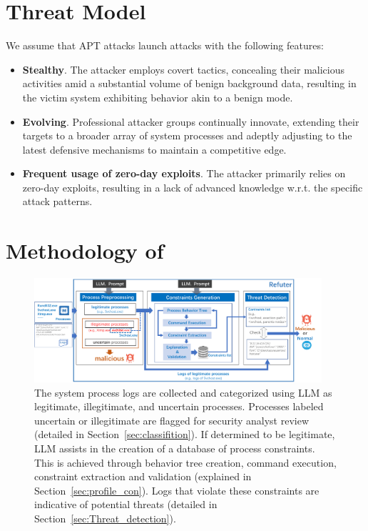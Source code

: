 \section{Threat Model}\label{sec:threatModel}
We assume that APT attacks launch attacks with the following features:

\begin{itemize}[leftmargin=*]
    \item \textbf{Stealthy}. The attacker employs covert tactics, concealing their malicious activities amid a substantial volume of benign background data, resulting in the victim system exhibiting behavior akin to a benign mode.
    \item \textbf{Evolving}. Professional attacker groups continually innovate, extending their targets to a broader array of system processes and adeptly adjusting to the latest defensive mechanisms to maintain a competitive edge.
    \item \textbf{Frequent usage of zero-day exploits}. The attacker primarily relies on zero-day exploits, resulting in a lack of advanced knowledge w.r.t. the specific attack patterns.
\end{itemize}

\section{Methodology of \tool}

\begin{figure}[ht]
    \centering
      \includegraphics[width=0.95\textwidth]{figs/overview.pdf}
    \caption{The system process logs are collected and categorized using LLM as legitimate, illegitimate, and uncertain processes. Processes labeled uncertain or illegitimate are flagged for security analyst review (detailed in Section~\ref{sec:classifition}). If determined to be legitimate, LLM assists in the creation of a database of process constraints. This is achieved through behavior tree creation, command execution, constraint extraction and validation (explained in Section~\ref{sec:profile_con}). Logs that violate these constraints are indicative of potential threats (detailed in Section~\ref{sec:Threat_detection}).}
    \label{fig-framework}
    \end{figure}


